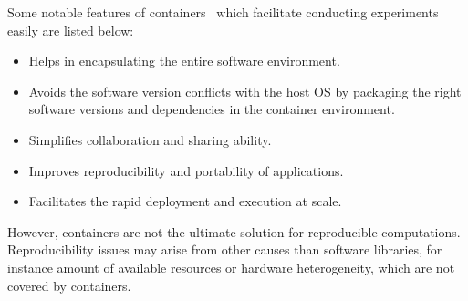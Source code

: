 Some notable features of containers~\cite{docker-run,DBLP:journals/corr/HaleLRW16,Julian:2016:CRI:2949550.2949562,10.1109/ISPASS.2015.7095802} which facilitate conducting experiments easily are listed below:

\begin{itemize}
  \item Helps in encapsulating the entire software environment.
  \item Avoids the software version conflicts with the host OS by packaging the right software versions and dependencies in the container environment.
  \item Simplifies collaboration and sharing ability.
  \item Improves reproducibility and portability of applications.
  \item Facilitates the rapid deployment and execution at scale.
\end{itemize}


However, containers are not the ultimate solution for reproducible computations. Reproducibility issues may arise from other causes than software libraries, for instance amount of available resources or hardware heterogeneity, which are not covered by containers.


